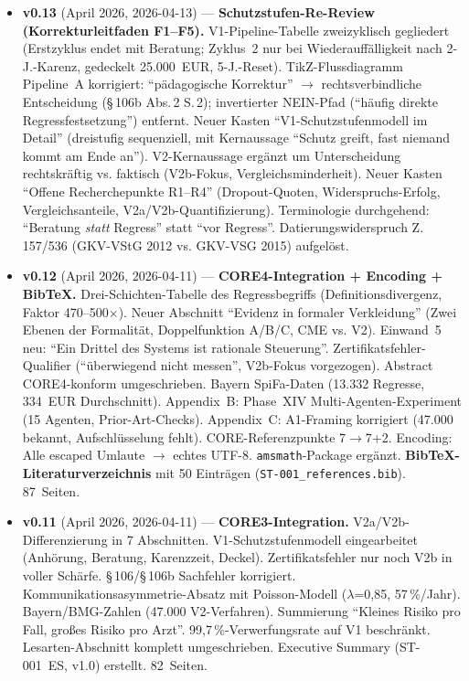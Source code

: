 \documentclass{umbruch-position}
\begin{document}
{\begin{itemize}[leftmargin=3em, itemsep=0.5em]
  \item \textbf{v0.13} (April 2026, 2026-04-13) --- \textbf{Schutzstufen-Re-Review (Korrekturleitfaden F1--F5).} V1-Pipeline-Tabelle zweizyklisch gegliedert (Erstzyklus endet mit Beratung; Zyklus~2 nur bei Wiederauffälligkeit nach 2-J.-Karenz, gedeckelt 25.000~EUR, 5-J.-Reset). TikZ-Flussdiagramm Pipeline~A korrigiert: ``pädagogische Korrektur'' $\to$ rechtsverbindliche Entscheidung (\S\,106b Abs.\,2 S.\,2); invertierter NEIN-Pfad (``häufig direkte Regressfestsetzung'') entfernt. Neuer Kasten ``V1-Schutzstufenmodell im Detail'' (dreistufig sequenziell, mit Kernaussage ``Schutz greift, fast niemand kommt am Ende an''). V2-Kernaussage ergänzt um Unterscheidung rechtskräftig vs. faktisch (V2b-Fokus, Vergleichsminderheit). Neuer Kasten ``Offene Recherchepunkte R1--R4'' (Dropout-Quoten, Widerspruchs-Erfolg, Vergleichsanteile, V2a/V2b-Quantifizierung). Terminologie durchgehend: ``Beratung \emph{statt} Regress'' statt ``vor Regress''. Datierungswiderspruch Z. 157/536 (GKV-VStG 2012 vs. GKV-VSG 2015) aufgelöst.

  \item \textbf{v0.12} (April 2026, 2026-04-11) --- \textbf{CORE4-Integration + Encoding + BibTeX.} Drei-Schichten-Tabelle des Regressbegriffs (Definitionsdivergenz, Faktor 470--500$\times$). Neuer Abschnitt ``Evidenz in formaler Verkleidung'' (Zwei Ebenen der Formalität, Doppelfunktion A/B/C, CME vs. V2). Einwand~5 neu: ``Ein Drittel des Systems ist rationale Steuerung''. Zertifikatsfehler-Qualifier (``überwiegend nicht messen'', V2b-Fokus vorgezogen). Abstract CORE4-konform umgeschrieben. Bayern SpiFa-Daten (13.332 Regresse, 334~EUR Durchschnitt). Appendix~B: Phase~XIV Multi-Agenten-Experiment (15 Agenten, Prior-Art-Checks). Appendix~C: A1-Framing korrigiert (47.000 bekannt, Aufschlüsselung fehlt). CORE-Referenzpunkte 7$\to$7+2. Encoding: Alle escaped Umlaute $\to$ echtes UTF-8. \texttt{amsmath}-Package ergänzt. \textbf{BibTeX-Literaturverzeichnis} mit 50 Einträgen (\texttt{ST-001\_references.bib}). 87~Seiten.

  \item \textbf{v0.11} (April 2026, 2026-04-11) --- \textbf{CORE3-Integration.} V2a/V2b-Differenzierung in 7 Abschnitten. V1-Schutzstufenmodell eingearbeitet (Anhörung, Beratung, Karenzzeit, Deckel). Zertifikatsfehler nur noch V2b in voller Schärfe. \S\,106/\S\,106b Sachfehler korrigiert. Kommunikationsasymmetrie-Absatz mit Poisson-Modell ($\lambda$=0,85, 57\,\%/Jahr). Bayern/BMG-Zahlen (47.000 V2-Verfahren). Summierung ``Kleines Risiko pro Fall, großes Risiko pro Arzt''. 99,7\,\%-Verwerfungsrate auf V1 beschränkt. Lesarten-Abschnitt komplett umgeschrieben. Executive Summary (ST-001~ES, v1.0) erstellt. 82~Seiten.


\end{itemize}}
\end{document}

